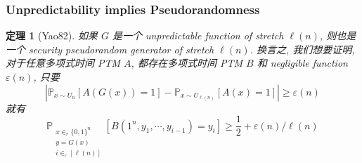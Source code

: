 \documentclass[8pt]{article}
\theoremstyle{compact}
\newtheorem{theorem}{定理}[section]
\def\ge{\geqslant}
\begin{document}
\subsubsection{Unpredictability implies Pseudorandomness}

\begin{theorem}[Yao82]
	如果 $G$ 是一个 unpredictable function of stretch $\ell(n)$, 则也是一个 security pseudorandom generator of stretch $\ell(n)$. 换言之, 我们想要证明, 对于任意多项式时间 PTM $A$, 都存在多项式时间 PTM $B$ 和 negligible function $\varepsilon(n)$, 只要 $$\left|\mathbb P_{x \sim U_n}[A(G(x)) = 1] - \mathbb P_{x \sim U_{\ell(n)}}[A(x) = 1]\right| \ge \varepsilon(n)$$ 就有 $$\mathbb P_{\substack{x \in_r \{0, 1\}^n \\ y = G(x) \\ i \in_r [\ell(n)]}}[B(1^n, y_1, \cdots, y_{i-1}) = y_i] \ge \frac12 + \varepsilon(n) / \ell(n)$$
\end{theorem}
\end{document}
